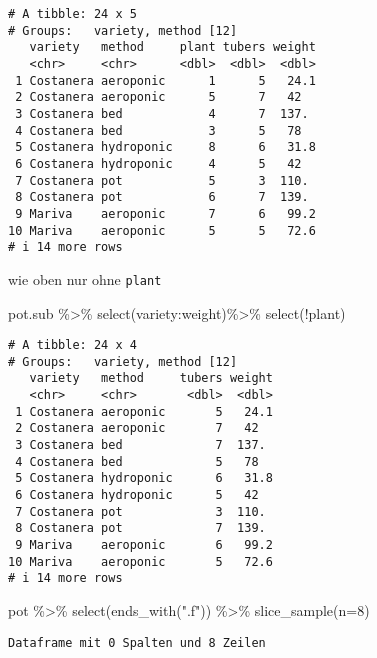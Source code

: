 \documentclass[
  letterpaper,
  DIV=11,
  numbers=noendperiod]{scrartcl}
\newenvironment{Shaded}{\begin{snugshade}}{\end{snugshade}}
\newcommand{\AttributeTok}[1]{\textcolor[rgb]{0.40,0.45,0.13}{#1}}
\newcommand{\DecValTok}[1]{\textcolor[rgb]{0.68,0.00,0.00}{#1}}
\newcommand{\FunctionTok}[1]{\textcolor[rgb]{0.28,0.35,0.67}{#1}}
\newcommand{\NormalTok}[1]{\textcolor[rgb]{0.00,0.23,0.31}{#1}}
\newcommand{\SpecialCharTok}[1]{\textcolor[rgb]{0.37,0.37,0.37}{#1}}
\newcommand{\StringTok}[1]{\textcolor[rgb]{0.13,0.47,0.30}{#1}}
\begin{document}
\begin{verbatim}
# A tibble: 24 x 5
# Groups:   variety, method [12]
   variety   method     plant tubers weight
   <chr>     <chr>      <dbl>  <dbl>  <dbl>
 1 Costanera aeroponic      1      5   24.1
 2 Costanera aeroponic      5      7   42  
 3 Costanera bed            4      7  137. 
 4 Costanera bed            3      5   78  
 5 Costanera hydroponic     8      6   31.8
 6 Costanera hydroponic     4      5   42  
 7 Costanera pot            5      3  110. 
 8 Costanera pot            6      7  139. 
 9 Mariva    aeroponic      7      6   99.2
10 Mariva    aeroponic      5      5   72.6
# i 14 more rows
\end{verbatim}

wie oben nur ohne \texttt{plant}

\begin{Shaded}
\begin{Highlighting}[]
\NormalTok{pot.sub }\SpecialCharTok{\%\textgreater{}\%} 
  \FunctionTok{select}\NormalTok{(variety}\SpecialCharTok{:}\NormalTok{weight)}\SpecialCharTok{\%\textgreater{}\%} 
  \FunctionTok{select}\NormalTok{(}\SpecialCharTok{!}\NormalTok{plant)}
\end{Highlighting}
\end{Shaded}

\begin{verbatim}
# A tibble: 24 x 4
# Groups:   variety, method [12]
   variety   method     tubers weight
   <chr>     <chr>       <dbl>  <dbl>
 1 Costanera aeroponic       5   24.1
 2 Costanera aeroponic       7   42  
 3 Costanera bed             7  137. 
 4 Costanera bed             5   78  
 5 Costanera hydroponic      6   31.8
 6 Costanera hydroponic      5   42  
 7 Costanera pot             3  110. 
 8 Costanera pot             7  139. 
 9 Mariva    aeroponic       6   99.2
10 Mariva    aeroponic       5   72.6
# i 14 more rows
\end{verbatim}

\begin{Shaded}
\begin{Highlighting}[]
\NormalTok{pot }\SpecialCharTok{\%\textgreater{}\%} 
  \FunctionTok{select}\NormalTok{(}\FunctionTok{ends\_with}\NormalTok{(}\StringTok{".f"}\NormalTok{)) }\SpecialCharTok{\%\textgreater{}\%} 
  \FunctionTok{slice\_sample}\NormalTok{(}\AttributeTok{n=}\DecValTok{8}\NormalTok{)}
\end{Highlighting}
\end{Shaded}

\begin{verbatim}
Dataframe mit 0 Spalten und 8 Zeilen
\end{verbatim}
\end{document}
